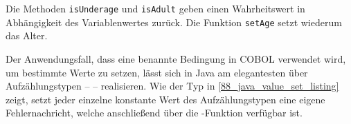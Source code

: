 Die Methoden \texttt{isUnderage} und \texttt{isAdult} geben einen Wahrheitswert in Abhängigkeit des Variablenwertes zurück. Die Funktion \texttt{setAge} setzt wiederum das Alter.

Der Anwendungsfall, dass eine benannte Bedingung in COBOL verwendet wird, um bestimmte Werte zu setzen, lässt sich in Java am elegantesten über Aufzählungstypen --  -- realisieren. Wie der Typ  in \autoref{88_java_value_set_listing} zeigt, setzt jeder einzelne konstante Wert des Aufzählungstypen eine eigene Fehlernachricht, welche anschließend über die -Funktion verfügbar ist.


